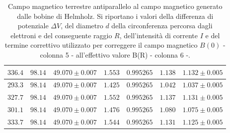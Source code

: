 \documentclass[]{article}
\begin{document}
\begin{table}[H]
\begin{tabular}{||c|c|c|c|c|c|c||}
    $336.4$ & $98.14$ & $49.070 \pm 0.007$ & $1.553$ & $0.995265$ & $1.138$ & $1.132 \pm 0.005$ \\\hline
    $293.3$ & $98.14$ & $49.070 \pm 0.007$ & $1.425$ & $0.995265$ & $1.042$ & $1.037 \pm 0.005$ \\\hline
    $327.7$ & $98.14$ & $49.070 \pm 0.007$ & $1.552$ & $0.995265$ & $1.137$ & $1.131 \pm 0.005$ \\\hline
    $301.1$ & $98.14$ & $49.070 \pm 0.007$ & $1.476$ & $0.995265$ & $1.080$ & $1.075 \pm 0.005$ \\\hline
    $333.7$ & $98.14$ & $49.070 \pm 0.007$ & $1.544$ & $0.995265$ & $1.131$ & $1.125 \pm 0.005$ \\\hline

\end{tabular}
    \caption{Campo magnetico terrestre antiparallelo al campo magnetico generato dalle bobine di Helmholz. Si riportano i valori della differenza di potenziale $\Delta V$, del diametro $ d $ della circonferenza percorsa dagli elettroni e del conseguente raggio $ R $, dell'intensità di corrente $ I $ e del termine correttivo utilizzato per correggere il campo magnetico $B(0)$ - colonna 5 - all'effettivo valore B(R) - colonna 6 -.}
    \label{CM_antiparallelo}
\end{table}
\end{document}
